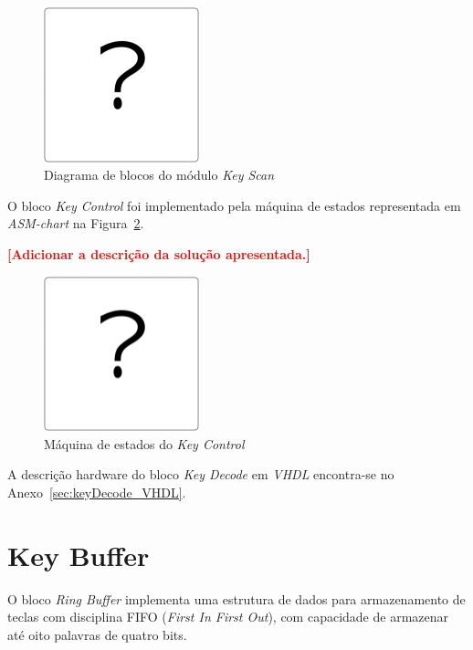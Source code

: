 \documentclass[10pt,a4paper,twocolumn]{article}
\begin{document}
\begin{figure}[!h]
\begin{center}
\includegraphics[width=0.40\textwidth]{dummyFigure.png} 
\caption{Diagrama de blocos do módulo \textit{Key Scan}}
\label{fig:keyScan}
\end{center}
\end{figure} 

O bloco \textit{Key Control }foi implementado pela máquina de estados representada em \textit{ASM-chart} na Figura~\ref{fig:keyControl_ASM}.

\textbf{\textcolor{red}{[Adicionar a descrição da solução apresentada.]}} 

\begin{figure}[!h]
\begin{center}
\includegraphics[width=0.40\textwidth]{dummyFigure.png} 
\caption{Máquina de estados do \textit{Key Control}}
\label{fig:keyControl_ASM}
\end{center}
\end{figure} 

A descrição hardware do bloco \textit{Key Decode} em\textit{ VHDL} encontra-se no Anexo~\ref{sec:keyDecode_VHDL}.

\section{Key Buffer}
O bloco \textit{Ring Buffer} implementa uma estrutura de dados para armazenamento de teclas com disciplina FIFO (\textit{First In First Out}), com capacidade de armazenar até oito palavras de quatro bits.
\end{document}
